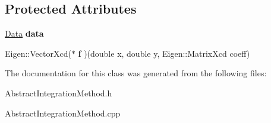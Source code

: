\subsection*{Protected Attributes}
\begin{DoxyCompactItemize}
\item 
\mbox{\label{classAbstractIntegrationMethod_a534b5ff7dfbccc1332cfbe66e817b389}} 
\hyperlink{structData}{Data} {\bfseries data}
\item 
\mbox{\label{classAbstractIntegrationMethod_a4de4f7ee55737b4f05f2b02649bf5ea0}} 
Eigen\+::\+Vector\+Xcd($\ast$ {\bfseries f} )(double x, double y, Eigen\+::\+Matrix\+Xcd coeff)
\end{DoxyCompactItemize}


The documentation for this class was generated from the following files\+:\begin{DoxyCompactItemize}
\item 
Abstract\+Integration\+Method.\+h\item 
Abstract\+Integration\+Method.\+cpp\end{DoxyCompactItemize}
